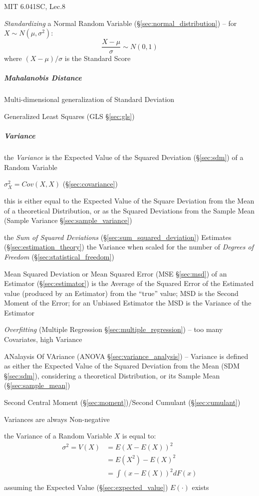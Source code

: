 MIT 6.041SC, Lec.8

\emph{Standardizing} a Normal Random Variable (\S\ref{sec:normal_distribution})
-- for $X \sim N(\mu, \sigma^2)$:
\[
  \frac{X - \mu}{\sigma} \sim N(0, 1)
\]
where $(X - \mu)/\sigma$ is the Standard Score



\subparagraph{Mahalanobis Distance}\label{sec:mahalanobis_distance}\hfill

Multi-dimensional generalization of Standard Deviation

Generalized Least Squares (GLS \S\ref{sec:gls})



\subparagraph{Variance}\label{sec:variance}\hfill

the \emph{Variance} is the Expected Value of the Squared Deviation
(\S\ref{sec:sdm}) of a Random Variable

$\sigma_X^2 = Cov(X,X)$ (\S\ref{sec:covariance})

this is either equal to the Expected Value of the Square Deviation from the
Mean of a theoretical Distribution, or as the Squared Deviations from the Sample
Mean (Sample Variance \S\ref{sec:sample_variance})

the \emph{Sum of Squared Deviations} (\S\ref{sec:sum_squared_deviation})
Estimates (\S\ref{sec:estimation_theory}) the Variance when scaled for the
number of \emph{Degrees of Freedom} (\S\ref{sec:statistical_freedom})

\fist Mean Squared Deviation or Mean Squared Error (MSE \S\ref{sec:msd}) of an
Estimator (\S\ref{sec:estimator}) is the Average of the Squared Error of the
Estimated value (produced by an Estimator) from the ``true'' value; MSD is
the Second Moment of the Error; for an Unbiased Estimator the MSD is the
Variance of the Estimator

\emph{Overfitting} (Multiple Regression \S\ref{sec:multiple_regression}) -- too
many Covariates, high Variance

\fist ANalaysis Of VAriance (ANOVA \S\ref{sec:variance_analysis}) --
Variance is defined as either the Expected Value of the
Squared Deviation from the Mean (SDM \S\ref{sec:sdm}), considering a theoretical
Distribution, or its Sample Mean (\S\ref{sec:sample_mean})

Second Central Moment (\S\ref{sec:moment})/Second Cumulant
(\S\ref{sec:cumulant})

Variances are always Non-negative

the Variance of a Random Variable $X$ is equal to:
\begin{align*}
  \sigma^2 = V(X) & = E(X - E(X))^2   \\
                  & = E(X^2) - E(X)^2 \\
                  & = \int(x - E(X))^2 dF(x) \\
\end{align*}
assuming the Expected Value (\S\ref{sec:expected_value}) $E(\cdot)$ exists

